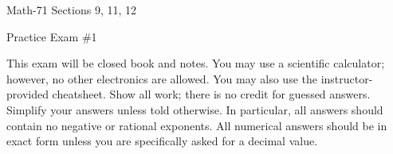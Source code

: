 \documentclass[letterpaper,12pt,fleqn]{article}
\begin{document}
\begin{center}
  \large
  Math-71 Sections 9, 11, 12

  \Large
  Practice Exam \#1
\end{center}

\vspace{0.5in}

This exam will be closed book and notes. You may use a scientific calculator; however, no other electronics are allowed.  You
may also use the instructor-provided cheatsheet.  Show all work; there is no credit for guessed answers.  Simplify your answers
unless told otherwise.  In particular, all answers should contain no negative or rational exponents.  All numerical answers
should be in exact form unless you are specifically asked for a decimal value.

\vspace{0.25in}
\end{document}
